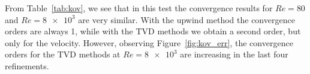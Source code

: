 From Table~\ref{tab:kov}, we see that in this test 
the convergence results for $Re=80$ and $Re=\num{8e3}$ are very similar. With 
the upwind method the convergence orders are always 1, while with the TVD 
methods we obtain a second order, but only for the velocity. However, observing 
Figure~\ref{fig:kov_err}, the convergence orders for the TVD methods at 
$Re=\num{8e3}$ are increasing in the last four refinements.
%
